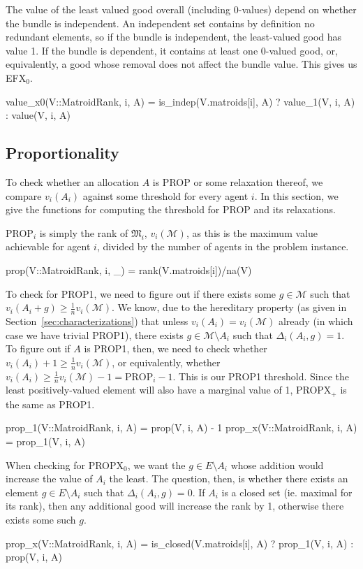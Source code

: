 The value of the least valued good overall (including 0-values) depend on whether the bundle is independent. An independent set contains by definition no redundant elements, so if the bundle is independent, the least-valued good has value 1. If the bundle is dependent, it contains at least one 0-valued good, or, equivalently, a good whose removal does not affect the bundle value. This gives us EFX$_0$.
\begin{jllisting}
value_x0(V::MatroidRank, i, A) =
    is_indep(V.matroids[i], A) ? value_1(V, i, A) : value(V, i, A)
\end{jllisting}


\subsection*{Proportionality}
To check whether an allocation $A$ is PROP or some relaxation thereof, we compare $v_i(A_i)$ against some threshold for every agent $i$. In this section, we give the functions for computing the threshold for PROP and its relaxations.

PROP$_i$ is simply the rank of $\mathfrak{M}_i$, $v_i(\mathcal{M})$, as this is the maximum value achievable for agent $i$, divided by the number of agents in the problem instance.
\begin{jllisting}
prop(V::MatroidRank, i, _) = rank(V.matroids[i])/na(V)
\end{jllisting}

To check for PROP1, we need to figure out if there exists some $g\in\mathcal{M}$ such that $v_i(A_i+g)\geq \frac{1}{n}v_i(\mathcal{M})$. We know, due to the hereditary property (as given in Section~\ref{sec:characterizations}) that unless $v_i(A_i) = v_i(\mathcal{M})$ already (in which case we have trivial PROP1), there exists $g\in\mathcal{M}\setminus A_i$ such that $\Delta_i(A_i, g) = 1$. To figure out if $A$ is PROP1, then, we need to check whether $v_i(A_i) + 1 \geq \frac{1}{n}v_i(\mathcal{M})$, or equivalently, whether $v_i(A_i) \geq \frac{1}{n}v_i(\mathcal{M})-1 = \text{PROP}_i - 1$. This is our PROP1 threshold. Since the least positively-valued element will also have a marginal value of 1, PROPX$_+$ is the same as PROP1.
\begin{jllisting}
prop_1(V::MatroidRank, i, A) = prop(V, i, A) - 1
prop_x(V::MatroidRank, i, A) = prop_1(V, i, A)
\end{jllisting}

When checking for PROPX$_0$, we want the $g\in E\setminus A_i$ whose addition would increase the value of $A_i$ the least. The question, then, is whether there exists an element $g\in E\setminus A_i$ such that $\Delta_i(A_i, g) = 0$. If $A_i$ is a closed set (ie. maximal for its rank), then any additional good will increase the rank by 1, otherwise there exists some such $g$.
\begin{jllisting}
prop_x(V::MatroidRank, i, A) = 
    is_closed(V.matroids[i], A) ? prop_1(V, i, A) : prop(V, i, A)
\end{jllisting}

